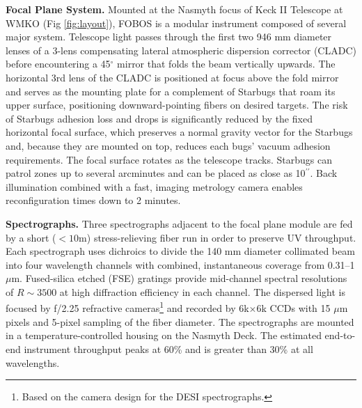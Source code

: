 \documentclass[oneside,11pt]{amsart}
\newcommand{\arcsec}{\mbox{$^{\prime\prime}$}}
\begin{document}
\noindent \textbf{Focal Plane System.} Mounted at the Nasmyth focus of Keck II Telescope at WMKO (Fig \ref{fig:layout}), FOBOS is a modular instrument
composed of several major system.  Telescope light passes through the first two 946 mm diameter lenses of a 3-lens
compensating lateral atmospheric dispersion corrector (CLADC) before encountering a 45$^\circ$ mirror that folds the
beam vertically upwards.  The horizontal 3rd lens of the CLADC is positioned at focus above the fold mirror and serves
as the mounting plate for a complement of Starbugs that roam its upper surface, positioning downward-pointing fibers on
desired targets.  The risk of Starbugs adhesion loss and drops is significantly reduced by the fixed horizontal focal
surface, which preserves a normal gravity vector for the Starbugs and, because they are mounted on top, reduces each
bugs' vacuum adhesion requirements.  The focal surface rotates as the telescope tracks.  Starbugs can patrol zones up to several arcminutes and can be placed as close as 10\arcsec{}.  Back illumination combined with a fast, imaging metrology camera enables reconfiguration times down to 2 minutes. 





\noindent \textbf{Spectrographs.} Three spectrographs adjacent to the focal plane module are fed by a short ($< 10$m)
stress-relieving fiber run in order to preserve UV throughput.  Each spectrograph uses dichroics to divide the 140 mm
diameter collimated beam into four wavelength channels with combined, instantaneous coverage from 0.31--1 $\mu$m.
Fused-silica etched (FSE) gratings provide mid-channel spectral resolutions of $R \sim 3500$ at high diffraction
efficiency in each channel.  The dispersed light is focused by f/2.25 refractive cameras\footnote{Based on the camera
design for the DESI spectrographs.} and recorded by 6k$\times$6k CCDs with 15 $\mu$m pixels and 5-pixel sampling of the
fiber diameter. The spectrographs are mounted in a temperature-controlled housing on the Nasmyth Deck.  The estimated
end-to-end instrument throughput peaks at 60\% and is greater than 30\% at all wavelengths.
\end{document}
